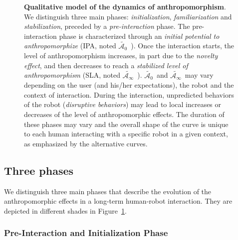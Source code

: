 \documentclass{frontiersSCNS} %
\newcommand{\IPAe}{{$\widetilde{\mathcal{A}_0}$~}}
\newcommand{\SLAe}{{$\widetilde{\mathcal{A}_\infty}$~}}
\begin{document}
\begin{figure}[htb]

\caption{\textbf{Qualitative model of the dynamics of anthropomorphism}. We
    distinguish three main phases: \emph{initialization}, \emph{familiarization}
    and \emph{stabilization}, preceded by a \emph{pre-interaction} phase. The
    pre-interaction phase is characterized through an \emph{initial potential to
    anthropomorphize} (IPA, noted \IPAe).  Once the interaction starts, the level
    of anthropomorphism increases, in part due to the \emph{novelty effect}, and then
    decreases to reach a \emph{stabilized level of anthropomorphism} (SLA, noted
    \SLAe). \IPAe and \SLAe may vary depending on the user (and his/her
    expectations), the robot and the context of interaction.  During the
    interaction, unpredicted behaviors of the robot (\emph{disruptive
    behaviors}) may lead to local increases or decreases of the level of
    anthropomorphic effects. The duration of these phases may vary and the
    overall shape of the curve is unique to each human interacting with a
    specific robot in a given context, as emphasized by the alternative curves.}

\label{fig:dynamics}
\end{figure}

\subsection{Three phases}
\label{sec:phases}

We distinguish three main phases that describe the evolution of the
anthropomorphic effects in a long-term human-robot interaction. They are
depicted in different shades in Figure~\ref{fig:dynamics}.

\subsubsection{Pre-Interaction and Initialization Phase\\}
\end{document}
